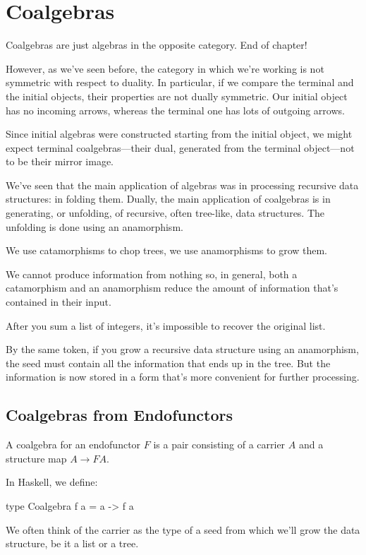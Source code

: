\documentclass[DaoFP]{subfiles}
\begin{document}
\setcounter{chapter}{11}

\chapter{Coalgebras}

Coalgebras are just algebras in the opposite category. End of chapter!

However, as we've seen before, the category in which we're working is not symmetric with respect to duality. In particular, if we compare the terminal and the initial objects, their properties are not dually symmetric. Our initial object has no incoming arrows, whereas the terminal one has lots of outgoing arrows. 

Since initial algebras were constructed starting from the initial object, we might expect terminal coalgebras---their dual, generated from the terminal object---not to be their mirror image.

We've seen that the main application of algebras was in processing recursive data structures: in folding them. Dually, the main application of coalgebras is in generating, or unfolding, of recursive, often tree-like, data structures. The unfolding is done using an anamorphism.

We use catamorphisms to chop trees, we use anamorphisms to grow them. 

We cannot produce information from nothing so, in general, both a catamorphism and an anamorphism reduce the amount of information that's contained in their input. 

After you sum a list of integers, it's impossible to recover the original list. 

By the same token, if you grow a recursive data structure using an anamorphism, the seed must contain all the information that ends up in the tree. But the information is now stored in a form that's more convenient for further processing.

\section{Coalgebras from Endofunctors}

A coalgebra for an endofunctor $F$ is a pair consisting of a carrier $A$ and a structure map $A \to F A$. 

In Haskell, we define:
\begin{haskell}
 type Coalgebra f a = a -> f a
\end{haskell}
We often think of the carrier as the type of a seed from which we'll grow the data structure, be it a list or a tree. 
\end{document}
